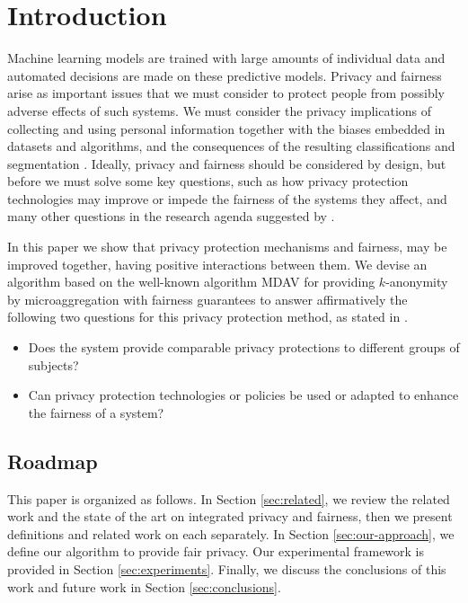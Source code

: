 \section{Introduction}
\label{sec:intro}
Machine learning models are trained with large amounts of individual data and automated decisions are made on these predictive models. Privacy and fairness arise as important issues that we must consider to protect people from possibly adverse effects of such systems. We must consider the privacy implications of collecting and using personal information together with the biases embedded in datasets and algorithms, and the consequences of the resulting classifications and segmentation \cite{Dwork-l:2013}.
Ideally, privacy and fairness should be considered by design, but before we must solve some key questions, such as how privacy protection technologies may improve or impede the fairness of the systems they affect, and many other questions in the research agenda suggested by \cite{Ekstrand:2018}. 

In this paper we show that privacy protection mechanisms and fairness, may be improved together, having positive interactions between them. 
We devise an algorithm based on the well-known algorithm MDAV for providing $k$-anonymity by microaggregation with fairness guarantees to answer affirmatively the following two questions for this privacy protection method, as stated in \cite{Ekstrand:2018}.
 
\begin{itemize}
\item Does the system provide comparable privacy protections to different groups of subjects?
\item Can privacy protection technologies or policies be used or adapted to enhance the fairness of a system? 
\end{itemize} 


\subsection{Roadmap}

This paper is organized as follows. In Section \ref{sec:related}, we review the related work and the state of the art on integrated privacy and fairness, then we present definitions and related work on each separately.
In Section \ref{sec:our-approach}, we define our algorithm to provide fair privacy. 
Our experimental framework is provided in Section \ref{sec:experiments}.
Finally, we discuss the conclusions of this work and future work in Section \ref{sec:conclusions}.
